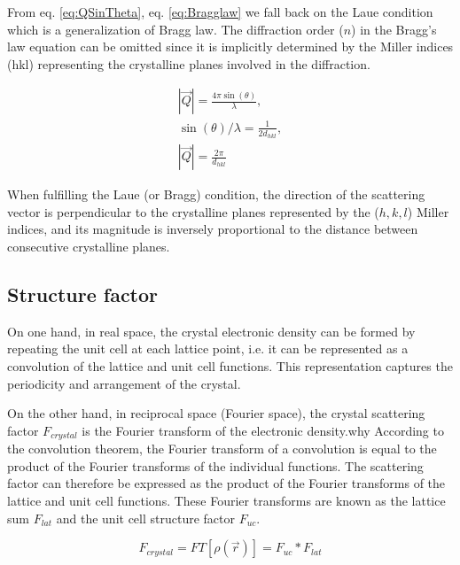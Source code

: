 From eq. \ref{eq:QSinTheta}, eq. \ref{eq:Bragglaw} we fall back on the Laue condition which is a generalization of Bragg law. The diffraction order ($n$) in the Bragg's law equation can be omitted since it is implicitly determined by the Miller indices (hkl) representing the crystalline planes involved in the diffraction.

\begin{gather}
    \label{eq:QandD}
    |\vec{Q}| = \frac{4\pi \sin(\theta)}{\lambda},\\
    \sin(\theta) / \lambda = \frac{1}{2d_{hkl}},\\
    |\vec{Q}| = \frac{2\pi}{d_{hkl}}
\end{gather}{}

When fulfilling the Laue (or Bragg) condition, the direction of the scattering vector is perpendicular to the crystalline planes represented by the ($h, k, l$) Miller indices, and its magnitude is inversely proportional to the distance between consecutive crystalline planes.

\subsection{Structure factor}

On one hand, in real space, the crystal electronic density can be formed by repeating the unit cell at each lattice point, i.e. it can be represented as a convolution of the lattice and unit cell functions.
This representation captures the periodicity and arrangement of the crystal.

On the other hand, in reciprocal space (Fourier space), the crystal scattering factor $F_{crystal}$ is the Fourier transform of the electronic density.\textcolor{Important}{why}
According to the convolution theorem, the Fourier transform of a convolution is equal to the product of the Fourier transforms of the individual functions.
The scattering factor can therefore be expressed as the product of the Fourier transforms of the lattice and unit cell functions.
These Fourier transforms are known as the lattice sum $F_{lat}$ and the unit cell structure factor $F_{uc}$.

\begin{equation}
    F_{crystal} = FT[\rho(\vec{r})] = F_{uc} * F_{lat}
    \label{eq:FcrystalFlatFuc}
\end{equation}

